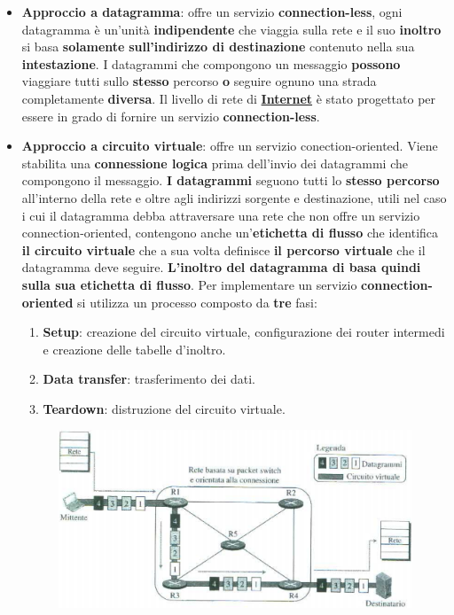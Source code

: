 \documentclass[11pt,a4paper,oneside]{book}
\theoremstyle{definition}
\begin{document}
\begin{itemize}
	\item \textbf{Approccio a datagramma}: offre un servizio \textbf{connection-less}, ogni datagramma è un'unità \textbf{indipendente} che viaggia sulla rete e il suo \textbf{inoltro} si basa \textbf{solamente} \textbf{sull'indirizzo di destinazione} contenuto nella sua \textbf{intestazione}. I datagrammi che compongono un messaggio \textbf{possono} viaggiare tutti sullo \textbf{stesso} percorso \textbf{o} seguire ognuno una strada completamente \textbf{diversa}. Il livello di rete di \textbf{\underline{Internet}} è stato progettato per essere in grado di fornire un servizio \textbf{connection-less}.

	      \pagebreak

	\item \textbf{Approccio a circuito virtuale}: offre un servizio conection-oriented. Viene
	      stabilita una \textbf{connessione logica} prima dell'invio dei datagrammi che compongono il messaggio. \textbf{I datagrammi} seguono tutti lo \textbf{stesso percorso} all'interno della rete e oltre agli indirizzi sorgente e destinazione, utili nel caso i cui il datagramma debba attraversare una rete che non offre un servizio connection-oriented, contengono anche un'\textbf{etichetta di flusso} che identifica \textbf{il circuito virtuale} che a sua volta definisce \textbf{il percorso virtuale} che il datagramma deve seguire. \textbf{L'inoltro del datagramma di basa quindi sulla sua etichetta di flusso}. Per implementare un servizio \textbf{connection-oriented} si utilizza un processo composto da \textbf{tre} fasi:
	      \begin{enumerate}
		      \item \textbf{Setup}: creazione del circuito virtuale, configurazione dei router intermedi e creazione delle tabelle d'inoltro.
		      \item \textbf{Data transfer}: trasferimento dei dati.
		      \item \textbf{Teardown}: distruzione del circuito virtuale.
	      \end{enumerate}
	      \begin{figure}[!h]
		      \includegraphics[scale=0.3]{Immagini/IP_conn.png}

\end{figure}
\end{itemize}
\end{document}
